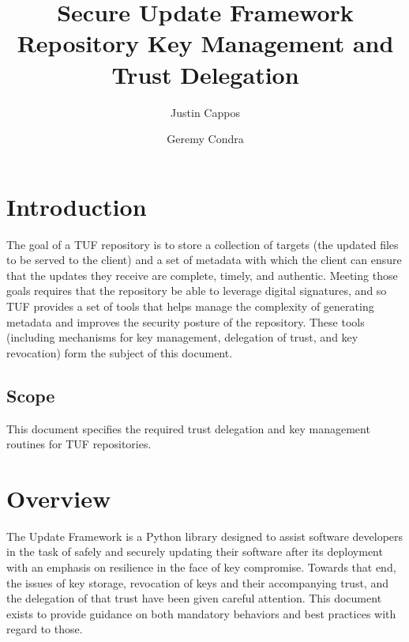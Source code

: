 \documentclass{article}
\begin{document}
\title{Secure Update Framework Repository Key Management and Trust Delegation}
\author{Justin Cappos \and Geremy Condra}
\maketitle


\section{Introduction}
The goal of a TUF repository is to store a collection of targets (the updated files 
to be served to the client) and a set of metadata with which the client can 
ensure that the updates they receive are complete, timely, and authentic. Meeting
those goals requires that the repository be able to leverage digital signatures,
and so TUF provides a set of tools that helps manage the complexity of generating 
metadata and improves the security posture of the repository. These tools 
(including mechanisms for key management, delegation of trust, and key revocation) 
form the subject of this document.

\subsection{Scope}
This document specifies the required trust delegation and key management routines
for TUF repositories.

\section{Overview}
The Update Framework is a Python library designed to assist software developers
in the task of safely and securely updating their software after its deployment
with an emphasis on resilience in the face of key compromise. Towards that end,
the issues of key storage, revocation of keys and their accompanying trust, and
the delegation of that trust have been given careful attention. This document
exists to provide guidance on both mandatory behaviors and best practices with 
regard to those.
\end{document}
